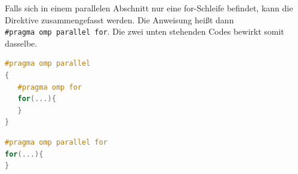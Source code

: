 \documentclass[../main.tex]{subfiles}
\begin{document}
Falls sich in einem parallelen Abschnitt nur eine for-Schleife befindet, kann die Direktive zusammengefasst werden. Die Anweisung heißt dann \texttt{\#pragma\ omp\ parallel\ for}. Die zwei unten stehenden Codes bewirkt somit dasselbe.

\begin{lstlisting}[language=c++, caption=For innerhalb eines parallelen Abschnitts, captionpos=b, label=listing:for_in_parallel, frame=single, linewidth=\textwidth, breaklines=true]
#pragma omp parallel
{
   #pragma omp for
   for(...){
   }
}
\end{lstlisting}


\begin{lstlisting}[language=c++, caption=Kurzschreibweise einer parallelen For-Schleife, captionpos=b, label=listing:parallel_for, frame=single, linewidth=\textwidth, breaklines=true]
#pragma omp parallel for
for(...){
}
\end{lstlisting}
\end{document}
